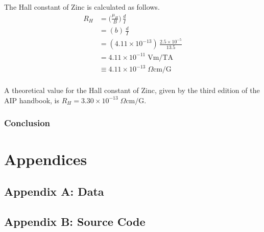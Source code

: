 \documentclass[a4paper]{article}
\begin{document}
The Hall constant of Zinc is calculated as follows.
\begin{align*}
R_H &= \big( \frac{\mu_H}{B} \big) \, \frac{d}{I} \\
    &= (b) \, \frac{d}{I} \\
    &= (4.11 \times 10^{-13}) \, \frac{2.5 \times 10^{-5}}{13.5} \\
    &= 4.11 \times 10^{-11} \; \text{Vm/TA} \\
    &\equiv 4.11 \times 10^{-13} \; \Omega \text{cm/G} \\
\end{align*}

A theoretical value for the Hall constant of Zinc, given by the third
edition of the AIP handbook, is $R_H = 3.30 \times 10^{-13} \; \Omega
\text{cm/G}$.




\subsubsection{Conclusion}

\section{Appendices}

\subsection{Appendix A: Data}

\subsection{Appendix B: Source Code}
\end{document}
